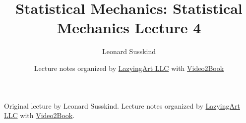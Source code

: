 \documentclass[11pt,oneside]{book}
\begin{document}
\frontmatter
\title{Statistical Mechanics: Statistical Mechanics Lecture 4}
\author{Leonard Susskind}
\date{Lecture notes organized by \href{https://lazying.art}{LazyingArt LLC} with \href{https://github.com/lachlanchen/Video2Book}{Video2Book}}
\maketitle
\begin{center}
\small Original lecture by Leonard Susskind. Lecture notes organized by \href{https://lazying.art}{LazyingArt LLC} with \href{https://github.com/lachlanchen/Video2Book}{Video2Book}.
\end{center}
\clearpage
\mainmatter

\end{document}
